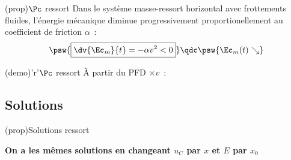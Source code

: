 \documentclass[../../main/main.tex]{subfiles}
\begin{document}
\begin{tcbraster}[raster columns=2, raster equal height=rows]
	\begin{tcb}[label=prop:emecacons,
			list entry={\lte\theprop~:~Bilan de puissance ressort}
		](prop){$\Pc$ ressort}
		Dans le système masse-ressort horizontal avec frottements fluides,
		l'énergie mécanique diminue progressivement proportionellement au
		coefficient de friction $\alpha$~:
		\begin{equation*}
			\psw{%
				\boxed{\dv{\Ec_{m}}{t} = -\alpha v^2 < 0}
			}%
			\qdc
			\psw{\Ec_m(t) \searrow}
		\end{equation*}
	\end{tcb}
	\begin{tcb}[label=demo:emecacons
		list entry={\lte\thedemo~:~Bilan de puissance ressort}
		](demo)'r'{$\Pc$ ressort}
		À partir du PFD $\times v$~:
	\end{tcb}
\end{tcbraster}

\subsection{Solutions}
\begin{center}
	\begin{tcb}[label=prop:ressortsolu](prop){Solutions ressort}
		\begin{center}
			\textbf{On a les mêmes solutions en changeant $u_C$ par $x$ et $E$
				par $x_0$}
		\end{center}
	\end{tcb}
\end{center}
\end{document}
